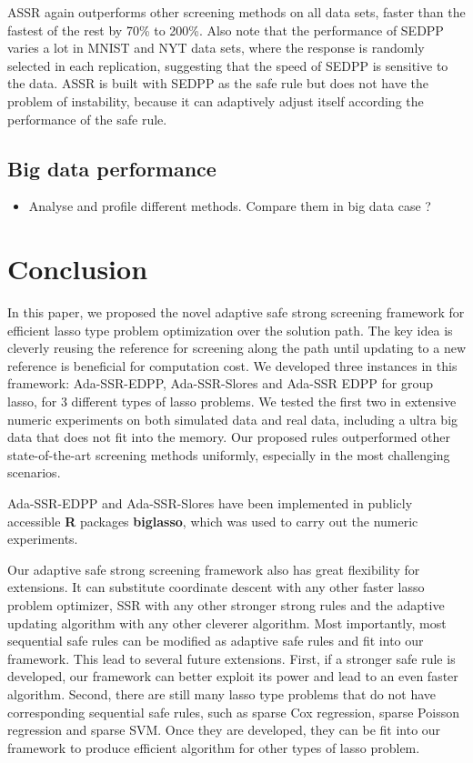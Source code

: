 \documentclass{article}
\begin{document}
ASSR again outperforms other screening methods on all data sets, faster than the fastest of the rest by 70\% to 200\%. Also note that the performance of SEDPP varies a lot in MNIST and NYT data sets, where the response is randomly selected in each replication, suggesting that the speed of SEDPP is sensitive to the data. ASSR is built with SEDPP as the safe rule but does not have the problem of instability, because it can adaptively adjust itself according the performance of the safe rule.



\subsection{Big data performance}

\begin{itemize}
    \item Analyse and profile different methods. Compare them in big data case ?
\end{itemize}

\section{Conclusion}
\label{sec:6}

In this paper, we proposed the novel adaptive safe strong screening framework for efficient lasso type problem optimization over the solution path. The key idea is cleverly reusing the reference for screening along the path until updating to a new reference is beneficial for computation cost.  We developed three instances in this framework: Ada-SSR-EDPP, Ada-SSR-Slores and Ada-SSR EDPP for group lasso, for 3 different types of lasso problems. We tested the first two in extensive numeric experiments on both simulated data and real data, including a ultra big data that does not fit into the memory. Our proposed rules outperformed other state-of-the-art screening methods uniformly, especially in the most challenging scenarios. 

Ada-SSR-EDPP and Ada-SSR-Slores have been implemented in  publicly accessible \textbf{R} packages \textbf{biglasso}\citep{zeng2017biglasso}, which was used to carry out the numeric experiments.

Our adaptive safe strong screening framework also has great flexibility for extensions. It can substitute coordinate descent with any other faster lasso problem optimizer, SSR with any other stronger strong rules and the adaptive updating algorithm with any other cleverer algorithm. Most importantly, most sequential safe rules can be modified as adaptive safe rules and fit into our framework. This lead to several future extensions. First, if a stronger safe rule is developed, our framework can better exploit its power and lead to an even faster algorithm. Second, there are still many lasso type problems that do not have corresponding sequential safe rules, such as sparse Cox regression, sparse Poisson regression and sparse SVM. Once they are developed, they can be fit into our framework to produce efficient algorithm for other types of lasso problem.


\end{document}
